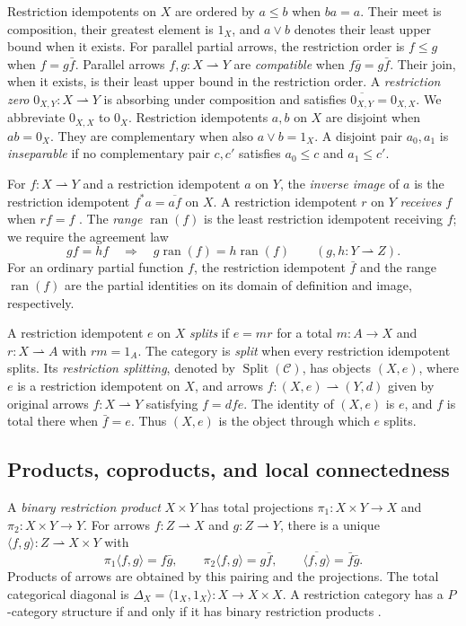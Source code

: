 \documentclass[11pt]{article}
\newcommand{\ran}{\operatorname{ran}}
\begin{document}
Restriction idempotents on $X$ are ordered by $a\le b$ when $ba=a$.
Their meet is composition, their greatest element is $1_X$, and
$a\vee b$ denotes their least upper bound when it exists.
For parallel partial arrows, the restriction order is
$f\le g$ when $f=g\bar f$.
Parallel arrows $f,g:X\rightharpoonup Y$ are \emph{compatible} when
$f\bar g=g\bar f$. Their join, when it exists, is their least upper
bound in the restriction order.
A \emph{restriction zero} $0_{X,Y}:X\rightharpoonup Y$ is
absorbing under composition and satisfies
$\overline{0_{X,Y}}=0_{X,X}$. We abbreviate $0_{X,X}$ to $0_X$.
Restriction idempotents $a,b$ on $X$ are disjoint when $ab=0_X$.
They are complementary when also $a\vee b=1_X$.
A disjoint pair $a_0,a_1$ is \emph{inseparable} if no complementary
pair $c,c'$ satisfies $a_0\le c$ and $a_1\le c'$.

For $f:X\rightharpoonup Y$ and a restriction idempotent $a$ on $Y$,
the \emph{inverse image} of $a$ is the restriction idempotent
$f^*a=\overline{af}$ on $X$.
A restriction idempotent $r$ on $Y$ \emph{receives} $f$ when $rf=f$
\cite[Section 6]{Heller}.
The \emph{range} $\ran(f)$ is the least restriction idempotent receiving $f$;
we require the agreement law
\[
 gf=hf\quad\Longrightarrow\quad
 g\ran(f)=h\ran(f)
 \qquad(g,h:Y\rightharpoonup Z).
\]
For an ordinary partial function $f$, the restriction idempotent
$\bar f$ and the range $\ran(f)$ are the partial identities on its
domain of definition and image, respectively.

A restriction idempotent $e$ on $X$ \emph{splits} if
$e=mr$ for a total $m:A\to X$ and $r:X\rightharpoonup A$
with $rm=1_A$. The category is \emph{split} when every restriction
idempotent splits.
Its \emph{restriction splitting}, denoted by
$\operatorname{Split}(\mathcal C)$, has objects $(X,e)$, where $e$ is a
restriction idempotent on $X$, and arrows
$f:(X,e)\rightharpoonup(Y,d)$ given by original arrows
$f:X\rightharpoonup Y$ satisfying $f=dfe$.
The identity of $(X,e)$ is $e$, and $f$ is total there when
$\bar f=e$. Thus $(X,e)$ is the object through which $e$ splits.

\subsection{Products, coproducts, and local connectedness}

A \emph{binary restriction product} $X\times Y$ has total
projections $\pi_1:X\times Y\to X$ and $\pi_2:X\times Y\to Y$.
For arrows $f:Z\rightharpoonup X$ and $g:Z\rightharpoonup Y$,
there is a unique $\langle f,g\rangle:Z\rightharpoonup X\times Y$
with
\[
 \pi_1\langle f,g\rangle=f\bar g,\qquad
 \pi_2\langle f,g\rangle=g\bar f,\qquad
 \overline{\langle f,g\rangle}=\bar f\bar g.
\]
Products of arrows are obtained by this pairing and the projections.
The total categorical diagonal is
$\Delta_X=\langle1_X,1_X\rangle:X\to X\times X$.
A restriction category has a $P$-category structure if and only if
it has binary restriction products
\cite[Proposition 4.5]{CockettLackIII}.
\end{document}
